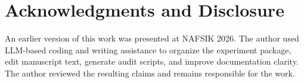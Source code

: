 \documentclass[10pt]{article}
\begin{document}
\section*{Acknowledgments and Disclosure}
An earlier version of this work was presented at NAFSIK 2026. The author used
LLM-based coding and writing assistance to organize the experiment package,
edit manuscript text, generate audit scripts, and improve documentation clarity.
The author reviewed the resulting claims and remains responsible for the work.



\end{document}
